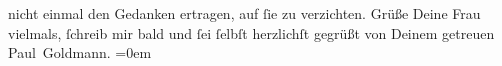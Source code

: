 \begin{ledgroupsized}[t]{13cm}
               nicht einmal den Gedanken ertragen, auf ſie zu verzichten.\pend
           \pstart
           Grüße Deine Frau
               vielmals, ſchreib mir bald und ſei ſelbſt herzlichſt gegrüßt von Deinem getreuen {\\[\baselineskip]}\spacefill\mbox{Paul Goldmann.}\pend
           \leftskip=0em{}
         
         \endnumbering{}\end{ledgroupsized}\begin{anhang}\end{anhang}\newcommand{\dateiname}{L03388}\newcommand{\titel}{Paul Goldmann an Arthur Schnitzler, 14. 11. [1903]}\newcommand{\editorInnen}{Martin Anton Müller und Laura Untner}
      